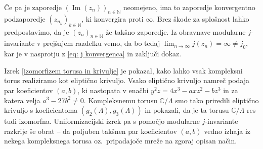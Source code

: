 \documentclass[mat1]{fmfdelo}
\numberwithin{equation}{section}
\newcommand{\N}{\mathbb N}
\newcommand{\Z}{\mathbb Z}
\newcommand{\C}{\mathbb C}
\newcommand{\HH}{\mathfrak{H}}
\newcommand{\torus}{\C/\Lambda}
\newcommand{\abs}[1]{\left\lvert #1 \right\rvert}
\renewcommand\Re{\operatorname{Re}}%
\renewcommand\Im{\operatorname{Im}}%
\newcommand{\oz}{oz.\ }
\theoremstyle{definition}
\begin{document}
\begin{dokaz}
    Če pa je zaporedje $(\Im(z_n))_{n \in \N}$ neomejeno, ima to zaporedje konvergentno podzaporedje $(z_{n_k})_{k \in \N}$, ki konvergira proti $\infty$. 
    Brez škode za splošnost lahko predpostavimo, da je $(z_n)_{n \in \N}$ že takšno zaporedje. Iz obravnave modularne $j$-invariante v prejšnjem razdelku vemo, da bo tedaj $\lim_{n \to \infty}j(z_n) = \infty \neq j_0$, kar je v nasprotju z \eqref{eq: j konvergenca} in zaključi dokaz.
\end{dokaz}

Izrek \ref{izomorfizem torusa in krivulje} je pokazal, kako lahko vsak kompleksni torus realiziramo kot eliptično krivuljo. Vsako eliptično krivuljo namreč podaja par koeficientov $(a,b)$, ki nastopata v enačbi $y^2z = 4x^3 - axz^2 - bz^3$ in za katera velja $a^3 - 27b^2 \neq 0$. Kompleksnemu torusu $\torus$ smo tako priredili eliptično krivuljo s koeficientoma $(g_2(\Lambda), g_3(\Lambda))$ in pokazali, da je ta torusu $\torus$ res tudi izomorfna. Uniformizacijski izrek pa s pomočjo modularne $j$-invariante razkrije še obrat -- da poljuben takšnen par koeficientov $(a,b)$ vedno izhaja iz nekega kompleksnega torusa \oz pripadajoče mreže na zgoraj opisan način.
\end{document}
